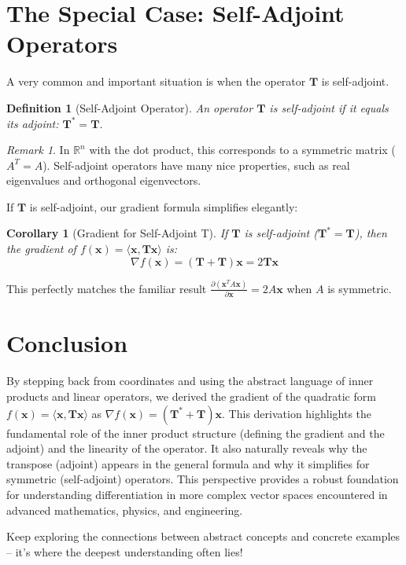 \documentclass[11pt]{article}
\theoremstyle{mydefinitionstyle}
\newtheorem{definition}{Definition}[section]
\theoremstyle{mytheoremstyle}
\newtheorem{corollary}{Corollary}[section]
\theoremstyle{remark}
\newtheorem{remark}{Remark}[section]
\newcommand{\R}{\mathbb{R}}
\newcommand{\T}{\mathbf{T}} %
\newcommand{\Tadj}{\mathbf{T}^*} %
\newcommand{\x}{\mathbf{x}} %
\newcommand{\grad}{\nabla} %
\newcommand{\inner}[2]{\langle #1, #2 \rangle} %
\newcommand{\pdx}[1]{\frac{\partial #1}{\partial \x}} %
\begin{document}
\section{The Special Case: Self-Adjoint Operators}

A very common and important situation is when the operator $\T$ is self-adjoint.

\begin{definition}[Self-Adjoint Operator]
    An operator $\T$ is self-adjoint if it equals its adjoint: $\Tadj = \T$.
\end{definition}
\begin{remark}
    In $\R^n$ with the dot product, this corresponds to a symmetric matrix ($A^T = A$). Self-adjoint operators have many nice properties, such as real eigenvalues and orthogonal eigenvectors.
\end{remark}

If $\T$ is self-adjoint, our gradient formula simplifies elegantly:

\begin{corollary}[Gradient for Self-Adjoint T]
    If $\T$ is self-adjoint ($\Tadj = \T$), then the gradient of $f(\x) = \inner{\x}{\T\x}$ is:
    \[ \grad f(\x) = (\T + \T)\x = 2\T\x \]
\end{corollary}

This perfectly matches the familiar result $\pdx{(\x^T A \x)} = 2A\x$ when $A$ is symmetric.

\section{Conclusion}

By stepping back from coordinates and using the abstract language of inner products and linear operators, we derived the gradient of the quadratic form $f(\x) = \inner{\x}{\T\x}$ as $\grad f(\x) = (\Tadj + \T)\x$. This derivation highlights the fundamental role of the inner product structure (defining the gradient and the adjoint) and the linearity of the operator. It also naturally reveals why the transpose (adjoint) appears in the general formula and why it simplifies for symmetric (self-adjoint) operators. This perspective provides a robust foundation for understanding differentiation in more complex vector spaces encountered in advanced mathematics, physics, and engineering.

Keep exploring the connections between abstract concepts and concrete examples – it's where the deepest understanding often lies!
\end{document}
